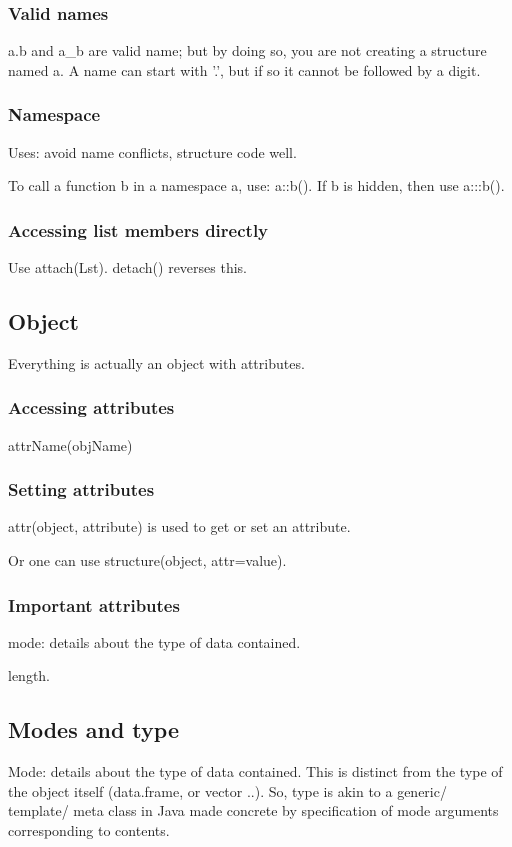 \documentclass[oneside, article]{memoir}
\begin{document}
\subsubsection{Valid names}
a.b and a\_b are valid name; but by doing so, you are not creating a structure named a. A name can start with '.', but if so it cannot be followed by a digit.

\subsubsection{Namespace}
Uses: avoid name conflicts, structure code well.

To call a function b in a namespace a, use: a::b(). If b is hidden, then use a:::b().

\subsubsection{Accessing list members directly}
Use attach(Lst). detach() reverses this.

\subsection{Object}
Everything is actually an object with attributes.

\subsubsection{Accessing attributes}
attrName(objName)

\subsubsection{Setting attributes}
attr(object, attribute) is used to get or set an attribute.

Or one can use structure(object, attr=value).

\subsubsection{Important attributes}
mode: details about the type of data contained.

length.

\subsection{Modes and type}
Mode: details about the type of data contained. This is distinct from the type of the object itself (data.frame, or vector ..). So, type is akin to a generic/ template/ meta class in Java made concrete by specification of mode arguments corresponding to contents.
\end{document}
